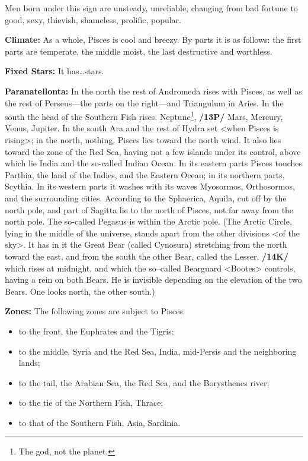 Men born under this sign are unsteady, unreliable, changing from bad fortune to good, sexy, thievish, shameless, prolific, popular.

\textbf{Climate:} As a whole, Pisces is cool and breezy. By parts it is as follows: the first parts are temperate, the
middle moist, the last destructive and worthless. 

\textbf{Fixed Stars:} It has…stars. 

\textbf{Paranatellonta:} In the north the rest of Andromeda rises with Pisces, as well as the rest of Perseus—the parts on the right—and Triangulum in Aries. In the south the head of the Southern Fish rises. Neptune\footnote{The god, not the planet.}, \textbf{/13P/} Mars, Mercury, Venus, Jupiter. In the south Ara and the rest of Hydra set <when Pisces is rising>; in the north, nothing. Pisces lies toward the north wind. It also lies toward the zone of the Red Sea, having not a few
islands under its control, above which lie India and the so-called Indian Ocean. In its eastern parts Pisces touches Parthia, the land of the Indies, and the Eastern Ocean; in its northern parts, Scythia. In its western parts it washes with its waves Myosormos, Orthosormos, and the surrounding cities.
According to the Sphaerica, Aquila, cut off by the north pole, and part of Sagitta lie to the north of Pisces, not far away from the north pole. The so-called Pegasus is within the Arctic pole. (The Arctic Circle, lying in the middle of the universe, stands apart from the other divisions <of the sky>. It has in it the Great Bear (called Cynosura) stretching from the north toward the east, and from the south the other Bear, called the Lesser, \textbf{/14K/} which rises at midnight, and which the so–called Bearguard <Bootes> controls, having a rein on both Bears. He is invisible depending on the elevation of the two Bears. One looks north, the other south.) 

\textbf{Zones:} The following zones are subject to Pisces: 
\begin{itemize}
\item to the front, the Euphrates and the Tigris; 
\item to the middle, Syria and the Red Sea, India, mid-Persis and the neighboring lands; 
\item to the tail, the Arabian Sea, the Red Sea, and the Borysthenes river; 
\item to the tie of the Northern Fish, Thrace; 
\item to that of the Southern Fish, Asia, Sardinia.
\end{itemize}

\newpage